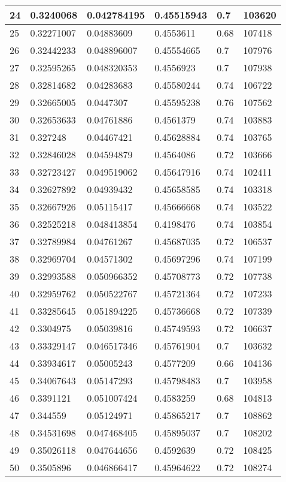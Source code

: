 \begin{longtable}{|l|l|l|l|l|l|}
24 & 0.3240068 & 0.042784195 & 0.45515943 & 0.7 & 103620 \\ \hline 
25 & 0.32271007 & 0.04883609 & 0.4553611 & 0.68 & 107418 \\ \hline 
26 & 0.32442233 & 0.048896007 & 0.45554665 & 0.7 & 107976 \\ \hline 
27 & 0.32595265 & 0.048320353 & 0.4556923 & 0.7 & 107938 \\ \hline 
28 & 0.32814682 & 0.04283683 & 0.45580244 & 0.74 & 106722 \\ \hline 
29 & 0.32665005 & 0.0447307 & 0.45595238 & 0.76 & 107562 \\ \hline 
30 & 0.32653633 & 0.04761886 & 0.4561379 & 0.74 & 103883 \\ \hline 
31 & 0.327248 & 0.04467421 & 0.45628884 & 0.74 & 103765 \\ \hline 
32 & 0.32846028 & 0.04594879 & 0.4564086 & 0.72 & 103666 \\ \hline 
33 & 0.32723427 & 0.049519062 & 0.45647916 & 0.74 & 102411 \\ \hline 
34 & 0.32627892 & 0.04939432 & 0.45658585 & 0.74 & 103318 \\ \hline 
35 & 0.32667926 & 0.05115417 & 0.45666668 & 0.74 & 103522 \\ \hline 
36 & 0.32525218 & 0.048413854 & 0.4198476 & 0.74 & 103854 \\ \hline 
37 & 0.32789984 & 0.04761267 & 0.45687035 & 0.72 & 106537 \\ \hline 
38 & 0.32969704 & 0.04571302 & 0.45697296 & 0.74 & 107199 \\ \hline 
39 & 0.32993588 & 0.050966352 & 0.45708773 & 0.72 & 107738 \\ \hline 
40 & 0.32959762 & 0.050522767 & 0.45721364 & 0.72 & 107233 \\ \hline 
41 & 0.33285645 & 0.051894225 & 0.45736668 & 0.72 & 107339 \\ \hline 
42 & 0.3304975 & 0.05039816 & 0.45749593 & 0.72 & 106637 \\ \hline 
43 & 0.33329147 & 0.046517346 & 0.45761904 & 0.7 & 103632 \\ \hline 
44 & 0.33934617 & 0.05005243 & 0.4577209 & 0.66 & 104136 \\ \hline 
45 & 0.34067643 & 0.05147293 & 0.45798483 & 0.7 & 103958 \\ \hline 
46 & 0.3391121 & 0.051007424 & 0.4583259 & 0.68 & 104813 \\ \hline 
47 & 0.344559 & 0.05124971 & 0.45865217 & 0.7 & 108862 \\ \hline 
48 & 0.34531698 & 0.047468405 & 0.45895037 & 0.7 & 108202 \\ \hline 
49 & 0.35026118 & 0.047644656 & 0.4592639 & 0.72 & 108425 \\ \hline 
50 & 0.3505896 & 0.046866417 & 0.45964622 & 0.72 & 108274 \\ \hline 
\end{longtable}